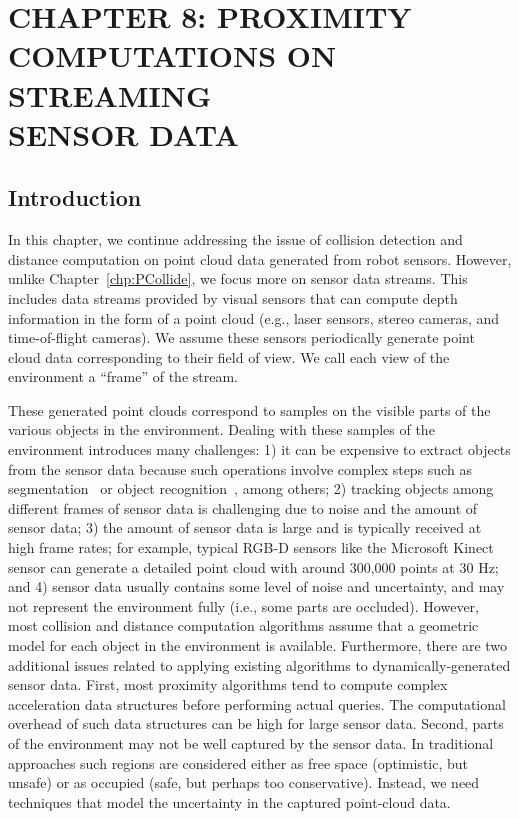 \chapter[PROXIMITY COMPUTATIONS ON STREAMING SENSOR DATA]{CHAPTER 8: PROXIMITY COMPUTATIONS ON STREAMING \\ SENSOR DATA}
\label{chp:PCollide2}


\section{Introduction}

In this chapter, we continue addressing
the issue of collision detection and distance computation on point cloud data generated from robot sensors. However, unlike Chapter~\ref{chp:PCollide}, we focus more on sensor data streams.
This includes data streams provided by visual sensors that can compute depth information in the form of a point cloud (e.g., laser sensors, stereo
cameras, and time-of-flight cameras). We assume these
sensors periodically generate point cloud data corresponding to their
field of view. We call each view of the environment a ``frame'' of the stream.

These generated point clouds correspond to samples on the visible parts
of the various objects in the environment. Dealing with these samples
of the environment introduces many challenges: 1) it can be expensive
to extract objects from the sensor data because such operations involve
complex steps such as segmentation~\cite{Rusu:2009:IROS} or object
recognition~\cite{Muja:2011:ICRA}, among others; 2) tracking objects
among different frames of sensor data is challenging due to noise and the
amount of sensor data; 3) the amount of sensor data is large and is typically
received at high frame rates; for example, typical RGB-D sensors like
the Microsoft Kinect  sensor can generate a detailed point
cloud with around 300,000 points at 30 Hz; and 4) sensor data usually
contains some level of noise and uncertainty, and may not represent
the environment fully (i.e., some parts are occluded). However, most
collision and distance computation algorithms assume that a geometric
model for each object in the environment is available. Furthermore,
there are two additional issues related to applying existing
algorithms to dynamically-generated sensor data. First, most proximity
algorithms tend to compute complex acceleration data structures before
performing actual queries. The computational overhead of such data structures can be high for large sensor data. Second, parts of the environment may not be well captured by the sensor data. In
traditional approaches such regions are considered either as
free space (optimistic, but unsafe) or as occupied (safe, but perhaps
too conservative). Instead, we need techniques that model the uncertainty in the captured point-cloud data.

